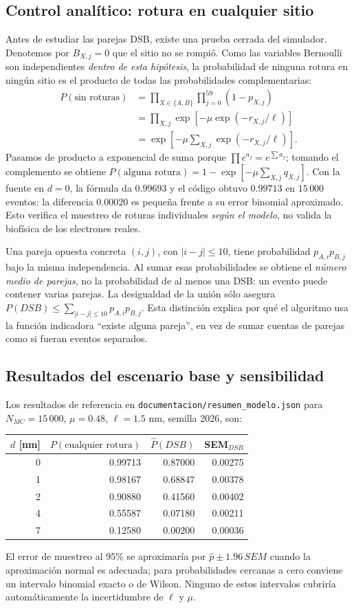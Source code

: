 \documentclass[11pt,a4paper]{article}
\begin{document}
\subsection{Control analítico: rotura en cualquier sitio}
Antes de estudiar las parejas DSB, existe una prueba cerrada del simulador. Denotemos por $B_{X,j}=0$ que el sitio no se rompió. Como las variables Bernoulli son independientes \emph{dentro de esta hipótesis}, la probabilidad de ninguna rotura en ningún sitio es el producto de todas las probabilidades complementarias:
\begin{align}
P(\text{sin roturas})&=\prod_{X\in\{A,B\}}\prod_{j=0}^{59}(1-p_{X,j})\\
&=\prod_{X,j}\exp[-\mu\exp(-r_{X,j}/\ell)]\\
&=\exp\left[-\mu\sum_{X,j}\exp(-r_{X,j}/\ell)\right].
\end{align}
Pasamos de producto a exponencial de suma porque $\prod e^{a_j}=e^{\sum a_j}$; tomando el complemento se obtiene $P(\text{alguna rotura})=1-\exp[-\mu\sum_{X,j}q_{X,j}]$. Con la fuente en $d=0$, la fórmula da $0.99693$ y el código obtuvo $0.99713$ en $15\,000$ eventos: la diferencia $0.00020$ es pequeña frente a su error binomial aproximado. Esto verifica el muestreo de roturas individuales \emph{según el modelo}, no valida la biofísica de los electrones reales.

Una pareja opuesta concreta $(i,j)$, con $|i-j|\leq10$, tiene probabilidad $p_{A,i}p_{B,j}$ bajo la misma independencia. Al sumar esas probabilidades se obtiene el \emph{número medio de parejas}, no la probabilidad de al menos una DSB: un evento puede contener varias parejas. La desigualdad de la unión sólo asegura $P(DSB)\leq\sum_{|i-j|\leq10}p_{A,i}p_{B,j}$. Esta distinción explica por qué el algoritmo usa la función indicadora ``existe alguna pareja'', en vez de sumar cuentas de parejas como si fueran eventos separados.

\subsection{Resultados del escenario base y sensibilidad}
Los resultados de referencia en \texttt{documentacion/resumen\_modelo.json} para $N_{MC}=15\,000$, $\mu=0.48$, $\ell=1.5$ nm, semilla 2026, son:
\begin{center}\small\begin{tabular}{rrrr}\toprule
$d$ [nm]& $P(\text{cualquier rotura})$ & $\widehat P(DSB)$ & SEM$_{DSB}$ \\ \midrule
0&0.99713&0.87000&0.00275\\
1&0.98167&0.68847&0.00378\\
2&0.90880&0.41560&0.00402\\
4&0.55587&0.07180&0.00211\\
7&0.12580&0.00200&0.00036\\ \bottomrule
\end{tabular}\end{center}
El error de muestreo al 95\% se aproximaría por $\widehat p\pm1.96\,SEM$ cuando la aproximación normal es adecuada; para probabilidades cercanas a cero conviene un intervalo binomial exacto o de Wilson. Ninguno de estos intervalos cubriría automáticamente la incertidumbre de $\ell$ y $\mu$.
\end{document}
